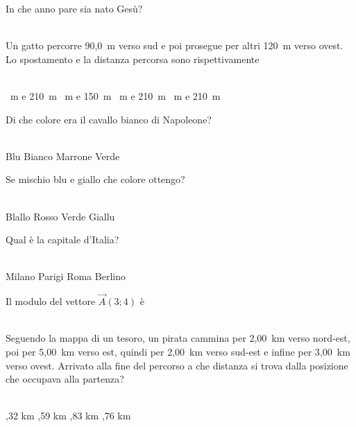 \documentclass[a4paper,11pt]{exam}
\begin{document}
    
    \newpage
    
    

        \begin{center} 
        \end{center}
\begin{questions}

    
\question In che anno pare sia nato Gesù?\\\
\begin{oneparchoices}
  \choice 20
\end{oneparchoices}

    
\question Un gatto percorre 90,0~m verso sud e poi prosegue per altri 120~m verso ovest. Lo spostamento e la distanza percorsa sono rispettivamente\\\
\begin{oneparchoices}
  \choice 30~m e 210~m
  ~m e 150~m
  ~m e 210~m
  \choice 210~m e 210~m
\end{oneparchoices}

    
\question Di che colore era il cavallo bianco di Napoleone?\\\
\begin{oneparchoices}
  \choice Blu 
  \choice Bianco
  \choice Marrone
  \choice Verde
\end{oneparchoices}

    
\question Se mischio blu e giallo che colore ottengo?\\\
\begin{oneparchoices}
  \choice Blallo
  \choice Rosso
  \choice Verde
  \choice Giallu
\end{oneparchoices}

    
\question Qual è la capitale d’Italia?\\\
\begin{oneparchoices}
  \choice Milano
  \choice Parigi
  \choice Roma
  \choice Berlino
\end{oneparchoices}

    
\question Il modulo del vettore $\vec{A}(3;4)$ è\\\
\begin{oneparchoices}
  \choice 12
  \choice 8
  \choice 25
  \choice 5
\end{oneparchoices}

    
\question Seguendo la mappa di un tesoro, un pirata cammina per 2,00~km verso nord-est, poi per 5,00~km verso est, quindi per 2,00~km verso sud-est e infine per 3,00~km verso ovest. Arrivato alla fine del percorso a che distanza si trova dalla posizione che occupava alla partenza?\\\
\begin{oneparchoices}
  \choice 6,32 km
  \choice 4,59 km
  \choice 4,83 km
  \choice 4,76 km
\end{oneparchoices}


\end{questions}
\end{document}
